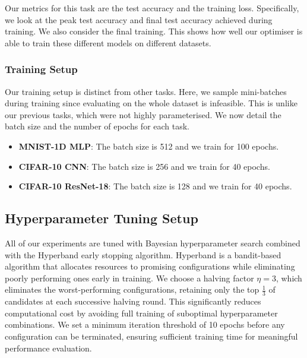 Our metrics for this task are the test accuracy and the training loss. Specifically, we look at the peak test accuracy and final test accuracy achieved during training. We also consider the final training. This shows how well our optimiser is able to train these different models on different datasets.

\subsubsection{Training Setup}
\label{sssec:task_3_training_setup}

Our training setup is distinct from other tasks. Here, we sample mini-batches during training since evaluating on the whole dataset is infeasible. This is unlike our previous tasks, which were not highly parameterised. We now detail the batch size and the number of epochs for each task.
\begin{itemize}
    \item \textbf{MNIST-1D MLP}: The batch size is 512 and we train for 100 epochs.
    \item \textbf{CIFAR-10 CNN}: The batch size is 256 and we train for 40 epochs.
    \item \textbf{CIFAR-10 ResNet-18}: The batch size is 128 and we train for 40 epochs.
\end{itemize}

\subsection{Hyperparameter Tuning Setup}
\label{ssec:hyperparameter_tuning_setup}

All of our experiments are tuned with Bayesian hyperparameter search combined with the Hyperband early stopping algorithm. Hyperband is a bandit-based algorithm that allocates resources to promising configurations while eliminating poorly performing ones early in training. We choose a halving factor $\eta = 3$, which eliminates the worst-performing configurations, retaining only the top $\frac{1}{3}$ of candidates at each successive halving round. This significantly reduces computational cost by avoiding full training of suboptimal hyperparameter combinations. We set a minimum iteration threshold of 10 epochs before any configuration can be terminated, ensuring sufficient training time for meaningful performance evaluation.

